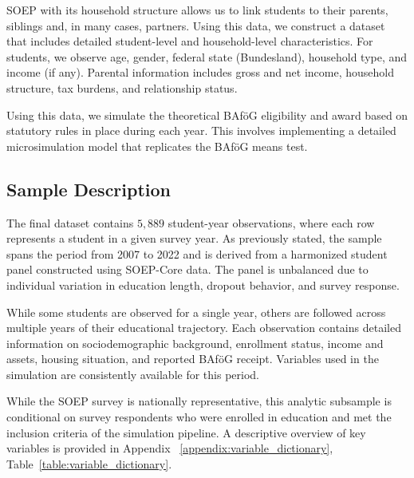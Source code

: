 SOEP with its household structure allows us to link students to their parents, siblings and, in many cases, partners.
Using this data, we construct a dataset that includes detailed student-level and household-level characteristics. 
For students, we observe age, gender, federal state (Bundesland), household type, and income (if any). 
Parental information includes gross and net income, household structure, tax burdens, and relationship status. 

Using this data, we simulate the theoretical BAföG eligibility and award based on statutory rules in place during each year. 
This involves implementing a detailed microsimulation model that replicates the BAföG means test.

\subsection{Sample Description}
The final dataset contains \( 5,889 \) student-year observations, where each row represents a student in a given survey year. As previously stated, the sample spans the period from 2007 to 2022 and is derived from a harmonized student panel constructed using SOEP-Core data. The panel is unbalanced due to individual variation in education length, dropout behavior, and survey response. 

While some students are observed for a single year, others are followed across multiple years of their educational trajectory. Each observation contains detailed information on sociodemographic background, enrollment status, income and assets, housing situation, and reported BAföG receipt. Variables used in the simulation are consistently available for this period.


While the SOEP survey is nationally representative, this analytic subsample is conditional on survey respondents who were enrolled in education and met the inclusion criteria of the simulation pipeline. 
A descriptive overview of key variables is provided in Appendix ~\ref{appendix:variable_dictionary}, Table~\ref{table:variable_dictionary}.




